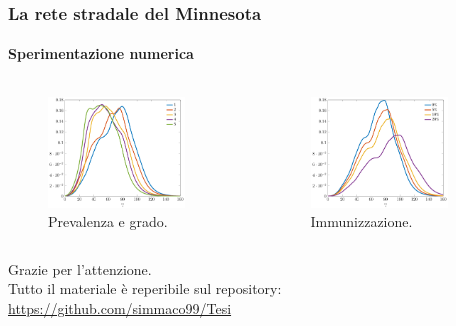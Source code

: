 \documentclass{beamer}
\theoremstyle{definition}
\theoremstyle{plain}
\begin{document}
\begin{frame}
\frametitle{La rete stradale del Minnesota}
\framesubtitle{Sperimentazione numerica}
\begin{columns}
\begin{column}{0.5\textwidth} 
 \begin{figure}
\centering
\includegraphics[width=0.85\textwidth]{Figure/minnesota_prevalenza}
\caption{Prevalenza e grado.}
\end{figure}
\end{column}
\begin{column}{0.5\textwidth}
\pause
 \begin{figure}
\centering
\includegraphics[width=0.85\textwidth]{Figure/minnesota_immunizzazione}
\caption{Immunizzazione.}
\end{figure}
\end{column}
\end{columns}
\end{frame}

\begin{frame}
\begin{center}
\begin{huge}
Grazie per l'attenzione.\\
Tutto il materiale \`e reperibile sul repository:\\
\url{https://github.com/simmaco99/Tesi}
\end{huge}
\end{center}
\end{frame}
\end{document}
